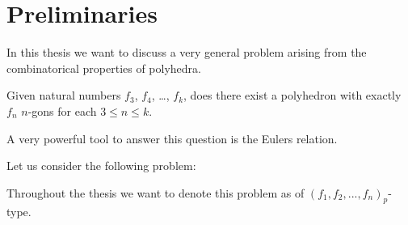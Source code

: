 \section{Preliminaries}

In this thesis we want to discuss a very general problem arising from the combinatorical properties of polyhedra.
\begin{problem*} Given natural numbers $f_3$, $f_4$, \dots, $f_k$, does there exist a polyhedron with exactly $f_n$ $n$-gons for each $3 \leq n \leq k$.
\end{problem*}
A very powerful tool to answer this question is the Eulers relation.
\begin{theorem*}\label{eulers_relation}
\end{theorem*}


Let us consider the following problem:

\begin{problem*}
\end{problem*}

Throughout the thesis we want to denote this problem as of $(f_1, f_2, ..., f_n)_p$-type.



